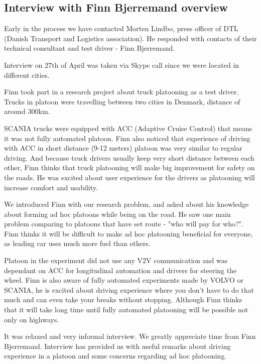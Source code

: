 \subsection{Interview with Finn Bjerremand overview}

Early in the process we have contacted Morten Lindbo, press officer of DTL (Danish Transport and Logistics association). He responded with contacts of their technical consultant and test driver - Finn Bjerremand.\par
% 
Interview on 27th of April was taken via Skype call since we were located in different cities.\par
% 
Finn took part in a research project about truck platooning as a test driver. Trucks in platoon were travelling between two cities in Denmark, distance of around 300km.\par
% 
SCANIA trucks were equipped with ACC (Adaptive Cruise Control) that means it was not fully automated platoon. Finn also noticed that experience of driving with ACC in short distance (9-12 meters) platoon was very similar to regular driving. And because truck drivers usually keep very short distance between each other, Finn thinks that truck platooning will make big improvement for safety on the roads. He was excited about user experience for the drivers as platooning will increase comfort and usability.\par
% 
We introduced Finn with our research problem, and asked about his knowledge about forming ad hoc platoons while being on the road. He saw one main problem comparing to platoons that have set route - "who will pay for who?". Finn thinks it will be difficult to make ad hoc platooning beneficial for everyone, as leading car uses much more fuel than others.\par
% 
Platoon in the experiment did not use any V2V communication and was dependant on ACC for longitudinal automation and drivers for steering the wheel. Finn is also aware of fully automated experiments made by VOLVO or SCANIA, he is excited about driving experience where you don't have to do that much and can even take your breaks without stopping. Although Finn thinks that it will take long time until fully automated platooning will be possible not only on highways.\par
% 
It was relaxed and very informal interview. We greatly appreciate time from Finn Bjerremand. Interview has provided us with useful remarks about driving experience in a platoon and some concerns regarding ad hoc platooning.